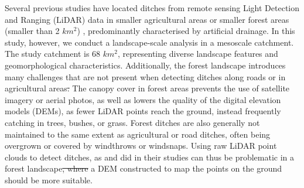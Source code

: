 \documentclass[11pt, review]{elsarticle} %
\providecommand{\DIFaddtex}[1]{{\protect\color{blue}\uwave{#1}}} %
\providecommand{\DIFdeltex}[1]{{\protect\color{red}\sout{#1}}}                      %
\providecommand{\DIFaddbegin}{} %
\providecommand{\DIFaddend}{} %
\providecommand{\DIFdelbegin}{} %
\providecommand{\DIFdelend}{} %
\providecommand{\DIFadd}[1]{\texorpdfstring{\DIFaddtex{#1}}{#1}} %
\providecommand{\DIFdel}[1]{\texorpdfstring{\DIFdeltex{#1}}{}} %
\begin{document}
Several previous studies have located ditches from remote sensing Light Detection and Ranging (LiDAR) data in smaller agricultural areas \citep{roelens, bailly} or smaller forest areas (smaller than 2 $km^2$) \citep{rapinel, kiss}, predominantly characterised by artificial drainage. In this study, however, we conduct a landscape-scale analysis in a mesoscale catchment. The study  catchment  is 68 $km^2$, representing diverse landscape features and geomorphological characteristics. Additionally, the forest landscape introduces many challenges that are not present when detecting ditches along roads or in agricultural areas\DIFdelbegin \DIFdel{. }\DIFdelend \DIFaddbegin \DIFadd{: }\DIFaddend The canopy cover in forest areas prevents the use of satellite imagery or aerial photos, as well as lowers the quality of the digital elevation models (DEMs), as fewer LiDAR points reach the ground, instead frequently catching in trees, bushes, or grass. Forest ditches are also generally not maintained to the same extent as agricultural or road ditches, often being overgrown or covered by windthrows or windsnaps. Using raw LiDAR point clouds to detect ditches, as \citet{roelens} and \citet{bailly} did in their studies can thus be problematic in a forest landscape\DIFdelbegin \DIFdel{, where }\DIFdelend \DIFaddbegin \DIFadd{. Instead, }\DIFaddend a DEM constructed to map the points on the ground should be more suitable.
\DIFaddbegin 
\end{document}
